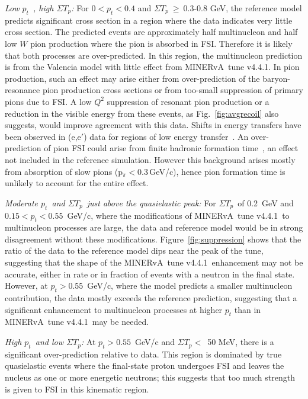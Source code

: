 \documentclass[aps,prl,twocolumn,showpacs,superscriptaddress, floatfix]{revtex4-2}  %
\newcommand{\minerva}{MINERvA}
\newcommand{\tune}{\minerva~tune v4.4.1}
\newcommand{\pt}{\ensuremath{p_{t}}}
\newcommand{\sumtp}{\ensuremath{\Sigma T_{p}}}
\begin{document}
\noindent
{\it Low \pt~, high $\sumtp$:} For $0<\pt<0.4$ and \sumtp$~\ge~$0.3-0.8 GeV, the reference model predicts significant cross section in a region where the data indicates very little cross section. The predicted events are approximately half multinucleon and half low $W$ pion production where the pion is absorbed in FSI. Therefore it is likely that both processes are over-predicted. In this region, the multinucleon prediction is from the Valencia model with little effect from \tune.  In pion production, such an effect may arise either from over-prediction of the baryon-resonance pion production cross sections or from too-small suppression of primary pions due to FSI.
A low $Q^2$ suppression of resonant pion production\cite{Stowell:2019zsh,MINOS:2014axb} or a reduction in the visible energy from these events\cite{MINERvA:2021wjs}, as Fig.~\ref{fig:avgrecoil} also suggests, would improve agreement with this data.
Shifts in energy transfers have been observed in (e,e$'$) data for regions of low energy transfer~\cite{Bodek:2020wbk, Bodek:2018lmc, Ankowski:2014yfa, Boffi:1993gs, Cooper:1993nx, OConnell:1990njm, Sealock:1989nx, Horikawa:1980cg, electronsforneutrinos:2020tbf, Ankowski:2020qbe}. An over-prediction of pion FSI could arise from finite hadronic formation time~\cite{Golan:2012wx}, an effect not included in the reference simulation.  However this background arises mostly from absorption of slow pions (p$_{\pi} < 0.3$\,GeV/c), hence pion formation time is unlikely to account for the entire effect.

\noindent
{\it Moderate \pt~and $\sumtp$~just above the quasielastic peak:} For \sumtp~of 0.2~GeV and $0.15<\pt<0.55$~GeV/c, where the modifications of \tune\ to  multinucleon processes are large,  the data and reference model would be in strong disagreement without these modifications.
Figure~\ref{fig:suppression} shows that the ratio of the data to the reference model dips near the peak of the tune, suggesting that the shape of the \tune\ enhancement may not be accurate, either in rate or in fraction of events with a neutron in the final state.  
However, at $\pt>0.55$~GeV/c, where the model predicts a smaller multinucleon contribution, the data mostly exceeds the reference prediction, suggesting that a significant enhancement to multinucleon processes at higher $\pt$ than in \tune\ may be needed.  

\noindent
{\it High \pt~and low $\sumtp$:} At $\pt>0.55$~GeV/c and $\sumtp<$~50 MeV, there is a significant over-prediction relative to data.  This region is dominated by true quasielastic events where the final-state proton undergoes FSI and leaves the nucleus as one or more energetic neutrons; this suggests that
too much strength is given to FSI in this kinematic region.
\end{document}
